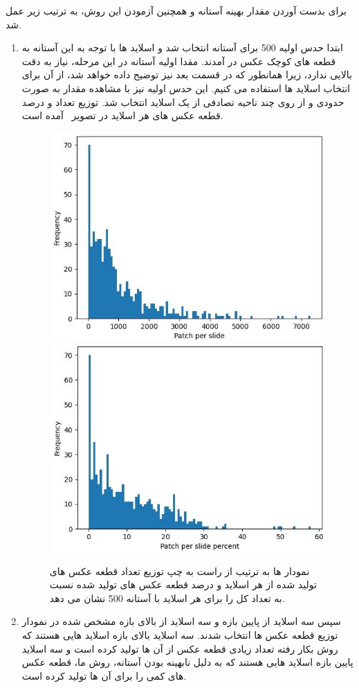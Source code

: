 برای بدست آوردن مقدار بهینه آستانه و همچنین آزمودن این روش، به ترتیب زیر عمل شد.
\begin{enumerate}
    \item ابتدا حدس اولیه 500 برای آستانه انتخاب شد و اسلاید ها با توجه به این آستانه به قطعه های کوچک عکس در آمدند.
    مقدا اولیه آستانه در این مرحله، نیاز به دقت بالایی ندارد، زیرا همانطور که در قسمت بعد نیز توضیح داده خواهد شد، از آن برای انتخاب اسلاید ها استفاده می کنیم.
    این حدس اولیه نیز با مشاهده مقدار به صورت حدودی و از روی چند ناحیه تصادفی از یک اسلاید انتخاب شد.
    توزیع تعداد و درصد قطعه عکس های هر اسلاید در تصویر~ آمده است.
    \begin{figure}
        \begin{center}
            \includegraphics[width=0.48\linewidth]{figs/introduction/subs/challenges/patch_distribution_old_500_threshold.jpeg}
            \includegraphics[width=0.48\linewidth]{figs/introduction/subs/challenges/patch_percent_distribution_old_threshold_500.jpeg}
        \end{center}
        \caption{نمودار ها به ترتیب از راست به چپ توزیع تعداد قطعه عکس های تولید شده از هر اسلاید و درصد قطعه عکس های تولید شده نسبت به تعداد کل را برای هر اسلاید با آستانه 500 نشان می دهد.}
        \label{شکل: توزیع تعداد و درصد قطعه عکس های هر اسلاید با آستانه 500}
    \end{figure}
    \item سپس سه اسلاید از پایین بازه و سه اسلاید از بالای بازه مشخص شده در نمودار توزیع قطعه عکس ها انتخاب شدند.
    سه اسلاید بالای بازه اسلاید هایی هستند که روش بکار رفته تعداد زیادی قطعه عکس از آن ها تولید کرده است و سه اسلاید پایین بازه اسلاید هایی هستند که به دلیل نابهینه بودن آستانه، روش ما، قطعه عکس های کمی را برای آن ها تولید کرده است.

\end{enumerate}

